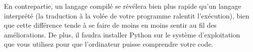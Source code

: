 En contrepartie, un langage compilé se révélera bien plus rapide qu'un langage interprété (la traduction à la volée de votre programme ralentit l'exécution), bien que cette différence tende à se faire de moins en moins sentir au fil des améliorations. De plus, il faudra installer Python sur le système d'exploitation que vous utilisez pour que l'ordinateur puisse comprendre votre code.



\newpage

%
%
%
%
%
